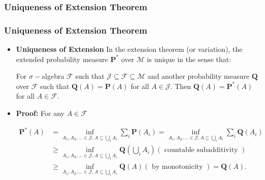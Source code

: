\documentclass[handout]{beamer}
\newcommand{\BP}{\mathbf{P}}
\begin{document}
\subsubsection{Uniqueness of Extension Theorem}
\frame
{
  \frametitle{Uniqueness of Extension Theorem}

   \begin{itemize}
       
       \item<1->[]    \begin{Theorem}[Proposition 2.5.7] \textbf{Uniqueness of Extension }In the extension theorem (or variation), the extended probability measure $\BP^*$ over $\mathcal{M}$ is unique in the sense that:
       
       For $\sigma-$algebra $\mathcal{F}$ such that $\mathcal{J} \subseteq \mathcal{F} \subseteq \mathcal{M}$ and another probability measure $\mathbf{Q}$ over $\mathcal{F}$ such that  $\mathbf{Q}(A)=\BP(A)$ for all $A\in\mathcal{J}$. Then  $\mathbf{Q}(A)=\BP^*(A)$ for all $A\in\mathcal{F}$.
            
            
\end{Theorem}    
    
\item<2->\textbf{Proof:} For any $A\in\mathcal{F}$
            
\begin{align*} \BP^*(A)& =\inf_{A_1,A_2,\ldots \in \mathcal{J}, A\subseteq \bigcup_i A_i} \sum_i \BP(A_i) =\inf_{A_1,A_2,\ldots \in \mathcal{J}, A\subseteq \bigcup_i A_i} \sum_i \mathbf{Q}(A_i) \\ 
&\geq \inf_{A_1,A_2,\ldots \in \mathcal{J}, A\subseteq \bigcup_i A_i} \mathbf{Q}\left( \bigcup_i A_i\right)   (\text{ countable subadditivity }) \\
&\geq \inf_{A_1,A_2\ldots, \in \mathcal{J}, A\subseteq \bigcup_i A_i} \mathbf{Q}(A)   (\text{ by monotonicity }) = \mathbf{Q}(A). 
\end{align*}

            
                   \end{itemize}
}
\end{document}
